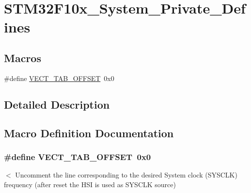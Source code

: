 \hypertarget{group___s_t_m32_f10x___system___private___defines}{\section{S\-T\-M32\-F10x\-\_\-\-System\-\_\-\-Private\-\_\-\-Defines}
\label{group___s_t_m32_f10x___system___private___defines}
}
\subsection*{Macros}
\begin{DoxyCompactItemize}
\item 
\#define \hyperlink{group___s_t_m32_f10x___system___private___defines_ga40e1495541cbb4acbe3f1819bd87a9fe}{V\-E\-C\-T\-\_\-\-T\-A\-B\-\_\-\-O\-F\-F\-S\-E\-T}~0x0
\end{DoxyCompactItemize}


\subsection{Detailed Description}


\subsection{Macro Definition Documentation}
\hypertarget{group___s_t_m32_f10x___system___private___defines_ga40e1495541cbb4acbe3f1819bd87a9fe}{
\subsubsection[{V\-E\-C\-T\-\_\-\-T\-A\-B\-\_\-\-O\-F\-F\-S\-E\-T}]{\setlength{\rightskip}{0pt plus 5cm}\#define V\-E\-C\-T\-\_\-\-T\-A\-B\-\_\-\-O\-F\-F\-S\-E\-T~0x0}}\label{group___s_t_m32_f10x___system___private___defines_ga40e1495541cbb4acbe3f1819bd87a9fe}
$<$ Uncomment the line corresponding to the desired System clock (S\-Y\-S\-C\-L\-K) frequency (after reset the H\-S\-I is used as S\-Y\-S\-C\-L\-K source)

